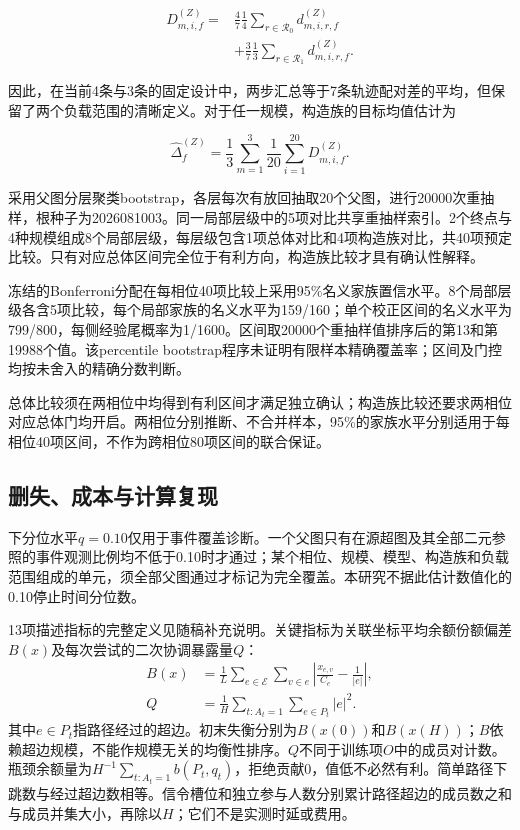 \documentclass[UTF8,a4paper,twocolumn,fontset=none,zihao=5]{ctexart}
\begin{document}
\begin{equation}
\begin{aligned}D_{m,i,f}^{(Z)}={}&\frac{4}{7}\frac{1}{4}\sum_{r\in\mathcal R_0}d_{m,i,r,f}^{(Z)}\\&+\frac{3}{7}\frac{1}{3}\sum_{r\in\mathcal R_1}d_{m,i,r,f}^{(Z)}.\end{aligned}
\label{eq:15}\end{equation}


因此，在当前4条与3条的固定设计中，两步汇总等于7条轨迹配对差的平均，但保留了两个负载范围的清晰定义。对于任一规模，构造族的目标均值估计为



\begin{equation}
\widehat\Delta_f^{(Z)}=\frac{1}{3}\sum_{m=1}^{3}\frac{1}{20}\sum_{i=1}^{20}D_{m,i,f}^{(Z)}.
\label{eq:16}\end{equation}


采用父图分层聚类bootstrap，各层每次有放回抽取20个父图，进行20000次重抽样，根种子为2026081003。同一局部层级中的5项对比共享重抽样索引。2个终点与4种规模组成8个局部层级，每层级包含1项总体对比和4项构造族对比，共40项预定比较。只有对应总体区间完全位于有利方向，构造族比较才具有确认性解释。


冻结的Bonferroni分配在每相位40项比较上采用95\%名义家族置信水平。8个局部层级各含5项比较，每个局部家族的名义水平为159/160；单个校正区间的名义水平为799/800，每侧经验尾概率为1/1600。区间取20000个重抽样值排序后的第13和第19988个值。该percentile bootstrap程序未证明有限样本精确覆盖率；区间及门控均按未舍入的精确分数判断。


总体比较须在两相位中均得到有利区间才满足独立确认；构造族比较还要求两相位对应总体门均开启。两相位分别推断、不合并样本，95\%的家族水平分别适用于每相位40项区间，不作为跨相位80项区间的联合保证。


\subsection{删失、成本与计算复现}

下分位水平$q=0.10$仅用于事件覆盖诊断。一个父图只有在源超图及其全部二元参照的事件观测比例均不低于0.10时才通过；某个相位、规模、模型、构造族和负载范围组成的单元，须全部父图通过才标记为完全覆盖。本研究不据此估计数值化的0.10停止时间分位数。


13项描述指标的完整定义见随稿补充说明。关键指标为关联坐标平均余额份额偏差$B(x)$及每次尝试的二次协调暴露量$Q$：
\[
\begin{aligned}
B(x)&=\frac1L\sum_{e\in\mathcal E}\sum_{v\in e}\left|\frac{x_{e,v}}{C_e}-\frac1{|e|}\right|,\\
Q&=\frac1H\sum_{t:A_t=1}\sum_{e\in P_t}|e|^2.
\end{aligned}
\]
其中$e\in P_t$指路径经过的超边。初末失衡分别为$B(x(0))$和$B(x(H))$；$B$依赖超边规模，不能作规模无关的均衡性排序。$Q$不同于训练项$O$中的成员对计数。瓶颈余额量为$H^{-1}\sum_{t:A_t=1}b(P_t,q_t)$，拒绝贡献0，值低不必然有利。简单路径下跳数与经过超边数相等。信令槽位和独立参与人数分别累计路径超边的成员数之和与成员并集大小，再除以$H$；它们不是实测时延或费用。
\end{document}
